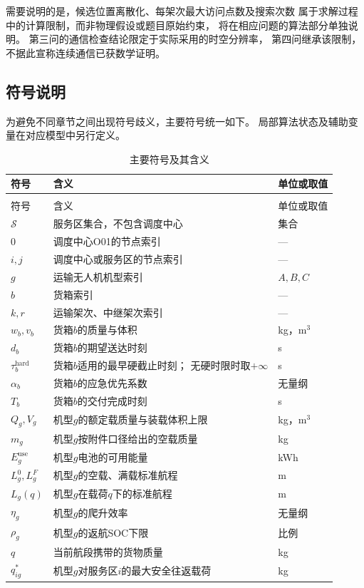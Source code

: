 \documentclass[bwprint]{gmcmthesis}
\begin{document}
需要说明的是，候选位置离散化、每架次最大访问点数及搜索次数
属于求解过程中的计算限制，而非物理假设或题目原始约束，
将在相应问题的算法部分单独说明。
第三问的通信检查结论限定于实际采用的时空分辨率，
第四问继承该限制，不据此宣称连续通信已获数学证明。

\subsection{符号说明}

为避免不同章节之间出现符号歧义，主要符号统一如下。
局部算法状态及辅助变量在对应模型中另行定义。

\renewcommand{\arraystretch}{1.18}
\begin{longtable}{
    >{\raggedright\arraybackslash}p{2.8cm}
    >{\raggedright\arraybackslash}p{8.4cm}
    >{\raggedright\arraybackslash}p{2cm}
}
    \caption{主要符号及其含义}
    \label{tab:notation}\\
    \toprule
    符号 & 含义 & 单位或取值 \\
    \midrule
    \endfirsthead

    \multicolumn{3}{c}{表~\thetable\quad 续表}\\
    \toprule
    符号 & 含义 & 单位或取值 \\
    \midrule
    \endhead

    \bottomrule
    \endfoot

    $\mathcal{S}$ & 服务区集合，不包含调度中心 & 集合 \\
    $0$ & 调度中心O01的节点索引 & --- \\
    $i,j$ & 调度中心或服务区的节点索引 & --- \\
    $g$ & 运输无人机机型索引 & $A,B,C$ \\
    $b$ & 货箱索引 & --- \\
    $k,r$ & 运输架次、中继架次索引 & --- \\

    $w_b,v_b$ & 货箱$b$的质量与体积 & kg，m$^3$ \\
    $d_b$ & 货箱$b$的期望送达时刻 & s \\
    $\tau_b^{\mathrm{hard}}$ &
    货箱$b$适用的最早硬截止时刻；
    无硬时限时取$+\infty$ & s \\
    $\alpha_b$ & 货箱$b$的应急优先系数 & 无量纲 \\
    $T_b$ & 货箱$b$的交付完成时刻 & s \\

    $Q_g,V_g$ & 机型$g$的额定载质量与装载体积上限 & kg，m$^3$ \\
    $m_g$ & 机型$g$按附件口径给出的空载质量 & kg \\
    $E_g^{\mathrm{use}}$ & 机型$g$电池的可用能量 & kWh \\
    $L_g^0,L_g^F$ & 机型$g$的空载、满载标准航程 & m \\
    $L_g(q)$ & 机型$g$在载荷$q$下的标准航程 & m \\
    $\eta_g$ & 机型$g$的爬升效率 & 无量纲 \\
    $\rho_g$ & 机型$g$的返航SOC下限 & 比例 \\
    $q$ & 当前航段携带的货物质量 & kg \\
    $q_{ig}^{*}$ & 机型$g$对服务区$i$的最大安全往返载荷 & kg \\


\end{longtable}
\end{document}
